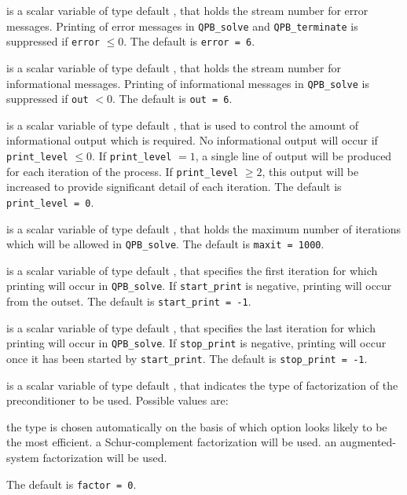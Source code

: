 \begin{description}

 is a scalar variable of type default \integer, that holds the
stream number for error messages. Printing of error messages in 
{\tt QPB\_solve} and {\tt QPB\_terminate} 
is suppressed if {\tt error} $\leq 0$.
The default is {\tt error = 6}.

 is a scalar variable of type default \integer, that holds the
stream number for informational messages. Printing of informational messages in 
{\tt QPB\_solve} is suppressed if {\tt out} $< 0$.
The default is {\tt out = 6}.

 is a scalar variable of type default \integer, that is used
to control the amount of informational output which is required. No 
informational output will occur if {\tt print\_level} $\leq 0$. If 
{\tt print\_level} $= 1$, a single line of output will be produced for each
iteration of the process. If {\tt print\_level} $\geq 2$, this output will be
increased to provide significant detail of each iteration.
The default is {\tt print\_level = 0}.

 is a scalar variable of type default \integer, that holds the
maximum number of iterations which will be allowed in {\tt QPB\_solve}.
The default is {\tt maxit = 1000}.

 is a scalar variable of type default \integer, that specifies
the first iteration for which printing will occur in {\tt QPB\_solve}.
If {\tt start\_print} is negative, printing will occur from the outset.
The default is {\tt start\_print = -1}.

 is a scalar variable of type default \integer, that specifies
the last iteration for which printing will occur in  {\tt QPB\_solve}.
If {\tt stop\_print} is negative, printing will occur once it has been 
started by {\tt start\_print}.
The default is {\tt stop\_print = -1}.

 is a scalar variable of type default \integer, that indicates
the type of factorization of the preconditioner to be used.  
Possible values are:

\begin{description}
 the type is chosen automatically on the basis of which option looks
        likely to be the most efficient.
 a Schur-complement factorization will be used.
 an augmented-system factorization will be used.
\end{description}
The default is {\tt factor = 0}.


\end{description}
